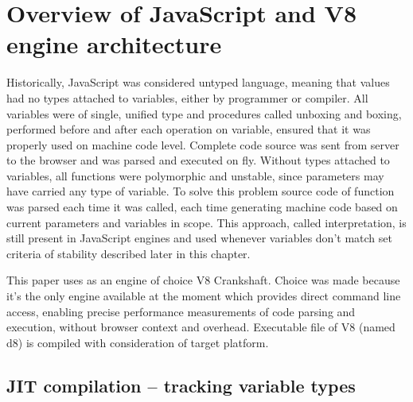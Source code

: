 \chapter{Overview of JavaScript and V8 engine architecture}
\label{cha:overview}

Historically, JavaScript was considered untyped language, meaning that values had no types attached to variables, either by programmer or compiler. All variables were of single, unified type and procedures called unboxing and boxing, performed before and after each operation on variable, ensured that it was properly used on machine code level. Complete code source was sent from server to the browser and was parsed and executed on fly. Without types attached to variables, all functions were polymorphic and unstable, since parameters may have carried any type of variable. To solve this problem source code of function was parsed each time it was called, each time generating machine code based on current parameters and variables in scope. This approach, called interpretation, is still present in JavaScript engines and used whenever variables don't match set criteria of stability described later in this chapter.

This paper uses as an engine of choice V8 Crankshaft. Choice was made because it's the only engine available at the moment which provides direct command line access, enabling precise performance measurements of code parsing and execution, without browser context and overhead. Executable file of V8 (named d8) is compiled with consideration of target platform.

\section{JIT compilation -- tracking variable types}
\label{sec:JIT}

